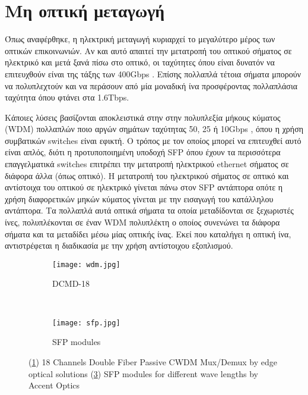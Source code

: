 
\section{Μη οπτική μεταγωγή}

Όπως αναφέρθηκε, η ηλεκτρική μεταγωγή κυριαρχεί το μεγαλύτερο μέρος
των οπτικών επικοινωνιών. Αν και αυτό απαιτεί την μετατροπή του
οπτικού σήματος σε ηλεκτρικό και μετά ξανά πίσω στο οπτικό, οι
ταχύτητες όπου είναι δυνατόν να επιτευχθούν είναι της τάξης των
400Gbps \cite{8207825}. Επίσης πολλαπλά τέτοια σήματα μπορούν να
πολυπλεχτούν και να περάσουν από μία μοναδική ίνα προσφέροντας
πολλαπλάσια ταχύτητα όπου φτάνει στα 1.6Tbps.

Κάποιες λύσεις βασίζονται αποκλειστικά στην στην πολυπλεξία μήκους
κύματος (WDM) πολλαπλών ποιο αργών σημάτων ταχύτητας 50, 25 ή 10Gbps
\cite{8438591}\cite{7526271}\cite{1700008}, όπου η χρήση συμβατικών
switches είναι εφικτή. Ο τρόπος με τον οποίος μπορεί να επιτευχθεί
αυτό είναι απλός, διότι η προτυποποιημένη υποδοχή SFP όπου έχουν τα
περισσότερα επαγγελματικά switches επιτρέπει την μετατροπή ηλεκτρικού
ethernet σήματος σε διάφορα άλλα (όπως οπτικό). Η μετατροπή του
ηλεκτρικού σήματος σε οπτικό και αντίστοιχα του οπτικού σε ηλεκτρικό
γίνεται πάνω στον SFP αντάπτορα οπότε η χρήση διαφορετικών μηκών
κύματος γίνεται με την εισαγωγή του κατάλληλου αντάπτορα. Τα πολλαπλά
αυτά οπτικά σήματα τα οποία μεταδίδονται σε ξεχωριστές ίνες,
πολυπλέκονται σε έναν WDM πολυπλέκτη ο οποίος συνενώνει τα διάφορα
σήματα και τα μεταδίδει μέσω μίας οπτικής ίνας. Εκεί που καταλήγει η
οπτική ίνα, αντιστρέφεται η διαδικασία με την χρήση αντίστοιχου
εξοπλισμού.

\begin{figure}[h]
  \centering
  \begin{subfigure}{0.4\linewidth}
    \texttt{[image: wdm.jpg]}
    \caption{DCMD-18}
    \label{wdm}
  \end{subfigure}
~
  \begin{subfigure}{0.4\linewidth}
    \texttt{[image: sfp.jpg]}
    \caption{SFP modules}
    \label{sfp}
  \end{subfigure}
  \caption{(\ref{wdm}) 18 Channels Double Fiber Passive CWDM Mux/Demux by
    edge optical solutions (\ref{sfp}) SFP modules for different wave lengths
    by Accent Optics}
\end{figure}

